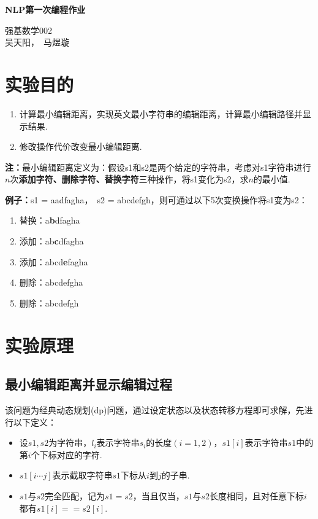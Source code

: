 \documentclass[12pt, a4paper, oneside]{ctexart}
\numberwithin{equation}{section}  %
\newenvironment{myTitle}[1]{
    \begin{center}
    {\zihao{-2}\bf #1\\}
    \zihao{-4}\it
}{\end{center}}  %
\begin{document}
\begin{myTitle}{NLP第一次编程作业}
    强基数学002\\
    吴天阳，\ 马煜璇
\end{myTitle}
\section{实验目的}
\begin{enumerate}
    \item 计算最小编辑距离，实现英文最小字符串的编辑距离，计算最小编辑路径并显示结果. 
    \item 修改操作代价改变最小编辑距离.
\end{enumerate}
\textbf{注：}最小编辑距离定义为：假设s1和s2是两个给定的字符串，考虑对s1字符串进行$n$次\textbf{添加字符、删除字符、替换字符}三种操作，将s1变化为s2，求$n$的最小值.

\noindent\textbf{例子：}s1 = aadfagha，\ s2 = abcdefgh，则可通过以下5次变换操作将s1变为s2：
\begin{enumerate}[label=\arabic*)]
    \item 替换：a\textbf{b}dfagha
    \item 添加：ab\textbf{c}dfagha
    \item 添加：abcd\textbf{e}fagha
    \item 删除：abcdefgha
    \item 删除：abcdefgh
\end{enumerate}
\section{实验原理}
\subsection{最小编辑距离并显示编辑过程}
    该问题为经典动态规划(dp)问题，通过设定状态以及状态转移方程即可求解，先进行以下定义：
    \begin{itemize}
        \item 设$s1,s2$为字符串，$l_i$表示字符串$s_i$的长度$(i=1,2)$，$s1[i]$表示字符串$s1$中的第$i$个下标对应的字符.
        \item $s1[i\cdots j]$表示截取字符串$s1$下标从$i$到$j$的子串.
        \item $s1$与$s2$完全匹配，记为$s1=s2$，当且仅当，$s1$与$s2$长度相同，且对任意下标$i$都有$s1[i] == s2[i]$.
    \end{itemize}
    
\end{document}
